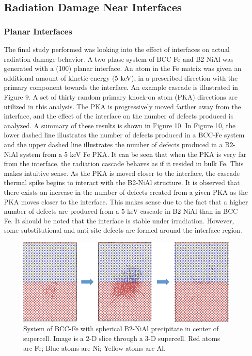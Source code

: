 \documentclass[review]{elsarticle}
\begin{document}
\subsection{Radiation Damage Near Interfaces}
\subsubsection{Planar Interfaces}
The final study performed was looking into the effect of interfaces on actual radiation damage behavior.  A two phase system of BCC-Fe and B2-NiAl was generated with a (100) planar interface.  An atom in the Fe matrix was given an additional amount of kinetic energy (5 keV), in a prescribed direction with the primary component towards the interface.  An example cascade is illustrated in Figure 9.  A set of thirty random primary knock-on atom (PKA) directions are utilized in this analysis.  The PKA is progressively moved farther away from the interface, and the effect of the interface on the number of defects produced is analyzed.  A summary of these results is shown in Figure 10.  In Figure 10, the lower dashed line illustrates the number of defects produced in a BCC-Fe system and the upper dashed line illustrates the number of defects produced in a B2-NiAl system from a 5 keV Fe PKA.  It can be seen that when the PKA is very far from the interface, the radiation cascade behaves as if it resided in bulk Fe.  This makes intuitive sense.  As the PKA is moved closer to the interface, the cascade thermal spike begins to interact with the B2-NiAl structure.  It is observed that there exists an increase in the number of defects created from a given PKA as the PKA moves closer to the interface.  This makes sense due to the fact that a higher number of defects are produced from a 5 keV cascade in B2-NiAl than in BCC-Fe.  It should be noted that the interface is stable under irradiation.  However, some substitutional and anti-site defects are formed around the interface region.

\begin{figure}[htp]
   \centering
   \includegraphics[width=\textwidth]{rad_dam_nf.png} 
   \caption{System of BCC-Fe with spherical B2-NiAl precipitate in center of supercell.  Image is a 2-D slice through a 3-D supercell.  Red atoms are Fe; Blue atoms are Ni; Yellow atoms are Al.}
   \label{fig:example}
\end{figure}
\end{document}
